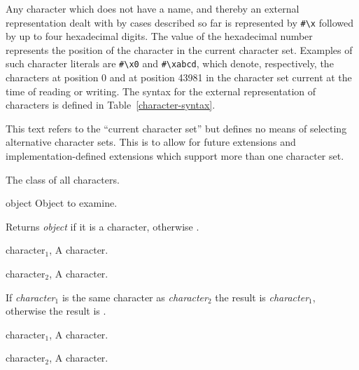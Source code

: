 \begin{optDefinition}
Any character which does not have a name, and thereby an external representation
dealt with by cases described so far is represented by \verb+#\x+ followed by up
to four hexadecimal digits.  The value of the hexadecimal number represents the
position of the character in the current character set.  Examples of such
character literals are \verb+#\x0+ and \verb+#\xabcd+, which denote,
respectively, the characters at position 0 and at position 43981 in the
character set current at the time of reading or writing.  The syntax for the
external representation of characters is defined in
Table~\ref{character-syntax}.

\begin{note}
    This text refers to the ``current character set'' but defines no means of
    selecting alternative character sets.  This is to allow for future
    extensions and implementation-defined extensions which support more than one
    character set.
\end{note}


The class of all characters.


\begin{arguments}

\item[{object}] Object to examine.

\end{arguments}

\result%
Returns {\em object\/} if it is a character, otherwise \nil.


\begin{specargs}

\item[character$_1$, \classref{character}] A character.

\item[character$_2$, \classref{character}] A character.

\end{specargs}

\result%
If {\em character$_1$\/} is the same character as {\em
character$_2$\/} the result is {\em character$_1$}, otherwise the
result is \nil.


\begin{specargs}
\item[character$_1$, \classref{character}] A character.
\item[character$_2$, \classref{character}] A character.
\end{specargs}


\end{optDefinition}
